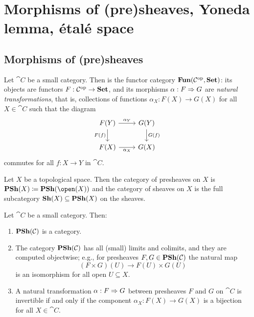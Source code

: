 \chapter{Morphisms of (pre)sheaves, Yoneda lemma, étalé space}\label{lecture:2}


\section{Morphisms of (pre)sheaves}

\begin{defn}
Let $\cat C$ be a small category.
Then  is the functor category $\operatorname{\mathbf{Fun}}(\mathcal{C}^{\mathrm{op}},\mathbf{Set})$: its objects are functors $F\colon\cat C\opp\to\catSet$, and its morphisms $\alpha\colon F\To G$ are \emph{natural transformations}, that is, collections of functions $\alpha_X\colon F(X)\to G(X)$ for all $X\in\cat C$ such that the diagram
\begin{equation*}
    \begin{tikzcd}
        F(Y) \ar[r, "\alpha_Y"] \ar[d, "F(f)"'] & G(Y) \ar[d, "G(f)"] \\
        F(X) \ar[r, "\alpha_X"'] & G(X)
    \end{tikzcd}
\end{equation*}
commutes for all $f\colon X\to Y$ in $\cat C$.
\end{defn}

\begin{defn}
Let $X$ be a topological space.
Then the category of presheaves on $X$ is $\catPresheaf(X)\coloneqq\catPresheaf(\open(X))$ and the category of sheaves on $X$ is the full subcategory $\operatorname{\mathbf{Sh}}(X)\subseteq\operatorname{\mathbf{PSh}}(X)$ on the sheaves.
\end{defn}

\begin{lem}\label{lem:psh-category-set}
Let $\cat C$ be a small category.
Then:
\begin{enumerate}
\item $\operatorname{\mathbf{PSh}}(\mathcal{C})$ is a category.
\item The category $\operatorname{\mathbf{PSh}}(\mathcal{C})$ has all (small) limits and colimits, and they are computed objectwise; e.g., for presheaves $F,G\in\operatorname{\mathbf{PSh}}(\mathcal{C})$ the natural map
    \[ (F\times G)(U) \to F(U)\times G(U) \]
    is an isomorphism for all open $U\subseteq X$.
\item A natural transformation $\alpha\colon F\To G$ between presheaves $F$ and $G$ on $\cat C$ is invertible if and only if the component $\alpha_X\colon F(X)\to G(X)$ is a bijection for all $X\in\cat C$.
\end{enumerate}
\end{lem}

